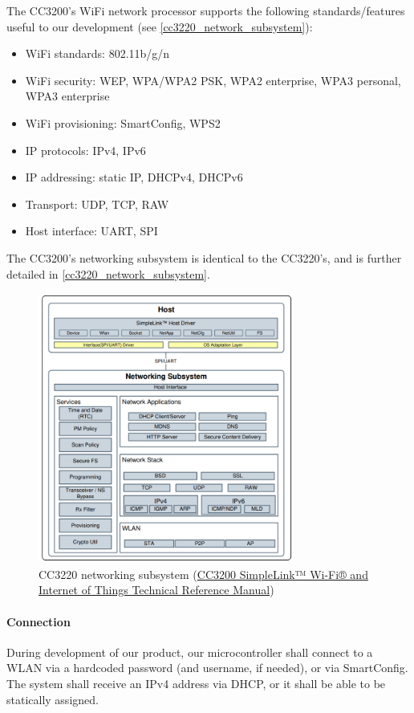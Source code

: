 The CC3200's WiFi network processor supports the following
standards/features useful to our development
(see \autoref{cc3220_network_subsystem}):
\begin{itemize}
    \item WiFi standards: 802.11b/g/n
    \item WiFi security: WEP, WPA/WPA2 PSK, WPA2 enterprise, WPA3 personal,
    WPA3 enterprise
    \item WiFi provisioning: SmartConfig, WPS2
    \item IP protocols: IPv4, IPv6
    \item IP addressing: static IP, DHCPv4, DHCPv6
    \item Transport: UDP, TCP, RAW
    \item Host interface: UART, SPI
\end{itemize}
The CC3200's networking subsystem is identical to the CC3220's, and is further detailed in \autoref{cc3220_network_subsystem}.
\begin{figure}[H]
    \caption{CC3220 networking subsystem (\href{https://www.ti.com/lit/ug/swru455m/swru455m.pdf}{CC3200 SimpleLink™ Wi-Fi® and Internet of Things Technical Reference Manual})}
    \label{cc3220_network_subsystem}
    \centering
    \includegraphics[width=0.75\textwidth]{images/cc3220_network_subsystem.png}
\end{figure}
\paragraph{Connection}
During development of our product, our microcontroller shall connect to a WLAN via a hardcoded password (and username, if needed), or via SmartConfig. The system shall receive an IPv4 address via DHCP, or it shall be able to be statically assigned.

